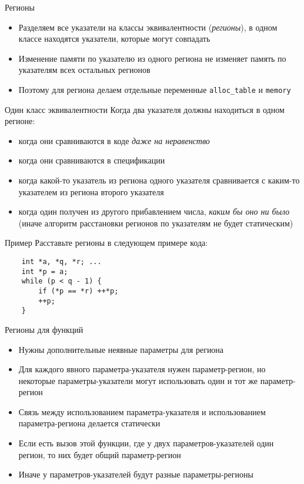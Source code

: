 \documentclass[hyperref={unicode=true}]{beamer}
\begin{document}
    \begin{frame}{Регионы}
    \begin{itemize}
    \item
    Разделяем все указатели на классы эквивалентности (\emph{регионы}),
    в одном классе находятся указатели, которые могут совпадать
    \item
    Изменение памяти по указателю из одного региона не
    изменяет память по указателям всех остальных регионов
    \item
    Поэтому для региона делаем отдельные переменные
    \texttt{alloc\_table} и \texttt{memory}
    \end{itemize}
    \end{frame}

    \begin{frame}{Один класс эквивалентности}
    Когда два указателя должны находиться в одном регионе:
    \begin{itemize}
    \item
    когда они сравниваются в коде \emph{даже на неравенство}
    \item
    когда они сравниваются в спецификации
    \item
    когда какой-то указатель из региона одного
    указателя сравнивается с каким-то указателем
    из региона второго указателя
    \item
    когда один получен из другого прибавлением числа,
    \emph{каким бы оно ни было} (иначе алгоритм расстановки
    регионов по указателям не будет статическим)
    \end{itemize}
    \end{frame}

    \begin{frame}[fragile]{Пример}
    Расставьте регионы в следующем примере кода:
    \begin{lstlisting}
    int *a, *q, *r; ...
    int *p = a;
    while (p < q - 1) {
        if (*p == *r) ++*p;
        ++p;
    }
    \end{lstlisting}
    \end{frame}

    \begin{frame}{Регионы для функций}
    \begin{itemize}
    \item
    Нужны дополнительные неявные параметры для региона
    \item
    Для каждого явного параметра-указателя нужен
    параметр-регион, но некоторые параметры-указатели
    могут использовать один и тот же параметр-регион
    \item
    Связь между использованием параметра-указателя
    и использованием параметра-региона делается
    статически
    \item
    Если есть вызов этой функции, где у двух
    параметров-указателей один регион, то них
    будет общий параметр-регион
    \item
    Иначе у параметров-указателей будут разные
    параметры-регионы
    \end{itemize}
    \end{frame}
\end{document}
